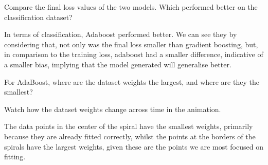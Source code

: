 \begin{problem}[2]
    Compare the final loss values of the two models. Which performed better on the classification dataset?
\end{problem}

\begin{solution}
  In terms of classification, Adaboost performed better. We can see they by considering that, not only was the final loss smaller than gradient boosting, but, in comparison to the training loss, adaboost had a smaller difference, indicative of a smaller bias, implying that the model generated will generalise better.
\end{solution}

\begin{problem}[2]
    For AdaBoost, where are the dataset weights the largest, and where are they the smallest?
\end{problem}
\begin{hint}
    Watch how the dataset weights change across time in the animation.
\end{hint}
\begin{solution}
   The data points in the center of the spiral have the smallest weights, primarily because they are already fitted correctly, whilst the points at the borders of the spirals have the largest weights, given these are the points we are most focused on fitting.
\end{solution}

